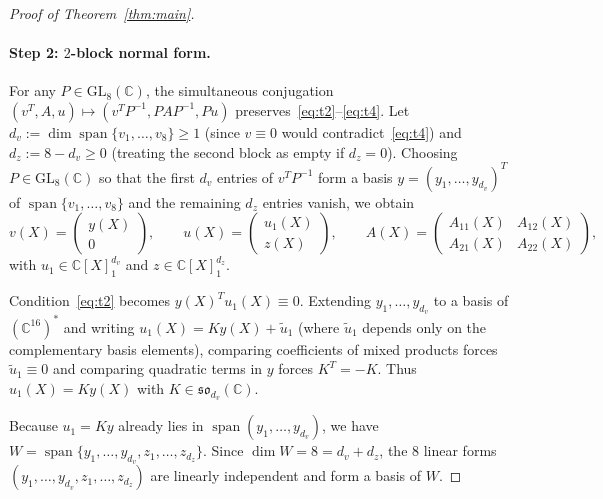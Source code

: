 \documentclass[11pt,a4paper]{article}
\theoremstyle{definition}
\DeclareMathOperator{\Span}{span}
\begin{document}
\begin{proof}[Proof of Theorem~\ref{thm:main}]
\paragraph{Step 2: $2$-block normal form.}
For any $P \in \mathrm{GL}_8(\mathbb{C})$, the simultaneous conjugation $(v^T, A, u) \mapsto (v^T P^{-1}, P A P^{-1}, P u)$ preserves~\eqref{eq:t2}--\eqref{eq:t4}. Let $d_v := \dim \Span\{v_1,\dots,v_8\} \ge 1$ (since $v \equiv 0$ would contradict~\eqref{eq:t4}) and $d_z := 8 - d_v \ge 0$ (treating the second block as empty if $d_z = 0$). Choosing $P \in \mathrm{GL}_8(\mathbb{C})$ so that the first $d_v$ entries of $v^T P^{-1}$ form a basis $y = (y_1,\dots,y_{d_v})^T$ of $\Span\{v_1,\dots,v_8\}$ and the remaining $d_z$ entries vanish, we obtain
\[
  v(X) = \begin{pmatrix} y(X) \\ 0 \end{pmatrix}, \qquad
  u(X) = \begin{pmatrix} u_1(X) \\ z(X) \end{pmatrix}, \qquad
  A(X) = \begin{pmatrix} A_{11}(X) & A_{12}(X) \\ A_{21}(X) & A_{22}(X) \end{pmatrix},
\]
with $u_1 \in \mathbb{C}[X]_1^{d_v}$ and $z \in \mathbb{C}[X]_1^{d_z}$.

Condition~\eqref{eq:t2} becomes $y(X)^T u_1(X) \equiv 0$. Extending $y_1,\dots,y_{d_v}$ to a basis of $(\mathbb{C}^{16})^*$ and writing $u_1(X) = K y(X) + \tilde{u}_1$ (where $\tilde{u}_1$ depends only on the complementary basis elements), comparing coefficients of mixed products forces $\tilde{u}_1 \equiv 0$ and comparing quadratic terms in $y$ forces $K^T = -K$. Thus $u_1(X) = K y(X)$ with $K \in \mathfrak{so}_{d_v}(\mathbb{C})$.

Because $u_1 = K y$ already lies in $\Span(y_1,\dots,y_{d_v})$, we have $W = \Span\{y_1,\dots,y_{d_v}, z_1,\dots,z_{d_z}\}$. Since $\dim W = 8 = d_v + d_z$, the $8$ linear forms $(y_1,\dots,y_{d_v}, z_1,\dots,z_{d_z})$ are linearly independent and form a basis of $W$.


\end{proof}
\end{document}
